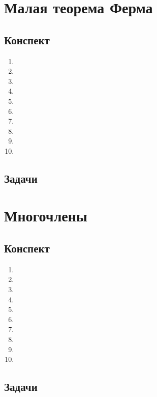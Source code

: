 \section{Малая теорема Ферма}

\subsection{Конспект}
\begin{enumerate}\setlength{\itemsep}{1pt}
\item 
\item 
\item 
\item 
\item 
\item 
\item 
\item 
\item 
\item 
\end{enumerate}
\subsection{Задачи}



\section{Многочлены}

\subsection{Конспект}
\begin{enumerate}\setlength{\itemsep}{1pt}
\item 
\item 
\item 
\item 
\item 
\item 
\item 
\item 
\item 
\item 
\end{enumerate}
\subsection{Задачи}






